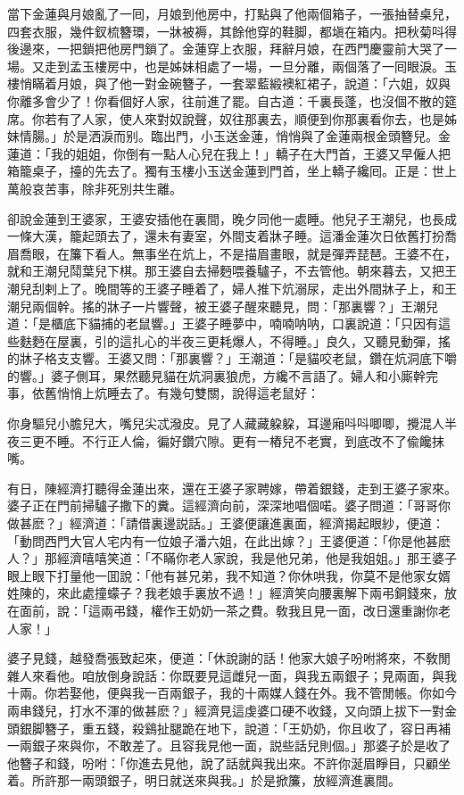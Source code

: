 當下金蓮與月娘亂了一囘，月娘到他房中，打點與了他兩個箱子，一張抽替桌兒，四套衣服，幾件釵梳簪環，一牀被褥，其餘他穿的鞋脚，都塡在箱内。把秋菊呌得後邊來，一把鎖把他房門鎖了。金蓮穿上衣服，拜辭月娘，在西門慶靈前大哭了一場。又走到孟玉樓房中，也是姊妹相處了一場，一旦分離，兩個落了一囘眼淚。玉樓悄瞞着月娘，與了他一對金碗簪子，一套翠藍緞襖紅裙子，說道：「六姐，奴與你離多會少了！你看個好人家，往前進了罷。自古道：千裏長蓬，也沒個不散的筵席。你若有了人家，使人來對奴說聲，奴往那裏去，順便到你那裏看你去，也是姊妹情腸。」於是洒淚而别。臨出門，小玉送金蓮，悄悄與了金蓮兩根金頭簪兒。金蓮道：「我的姐姐，你倒有一點人心兒在我上！」轎子在大門首，王婆又早僱人把箱籠桌子，擡的先去了。獨有玉樓小玉送金蓮到門首，坐上轎子纔囘。正是：世上萬般哀苦事，除非死別共生離。

卻說金蓮到王婆家，王婆安插他在裏間，晚夕同他一處睡。他兒子王潮兒，也長成一條大漢，籠起頭去了，還未有妻室，外間支着牀子睡。這潘金蓮次日依舊打扮喬眉喬眼，在簾下看人。無事坐在炕上，不是描眉畫眼，就是彈弄琵琶。王婆不在，就和王潮兒鬦葉兒下棋。那王婆自去掃麪喂養驢子，不去管他。朝來暮去，又把王潮兒刮剌上了。晚間等的王婆子睡着了，婦人推下炕溺尿，走出外間牀子上，和王潮兒兩個幹。搖的牀子一片響聲，被王婆子醒來聽見，問：「那裏響？」王潮兒道：「是櫃底下貓捕的老鼠響。」王婆子睡夢中，喃喃呐呐，口裏說道：「只因有這些麩麪在屋裏，引的這扎心的半夜三更耗爆人，不得睡。」良久，又聽見動彈，搖的牀子格支支響。王婆又問：「那裏響？」王潮道：「是貓咬老鼠，鑽在炕洞底下嚼的響。」婆子側耳，果然聽見貓在炕洞裏狼虎，方纔不言語了。婦人和小廝幹完事，依舊悄悄上炕睡去了。有幾句雙關，說得這老鼠好：

\begin{myquote}
你身驅兒小膽兒大，嘴兒尖忒潑皮。見了人藏藏躱躱，耳邊廂呌呌唧唧，攪混人半夜三更不睡。不行正人倫，徧好鑽穴隙。更有一樁兒不老實，到底改不了偸饞抹嘴。
\end{myquote}

有日，陳經濟打聽得金蓮出來，還在王婆子家聘嫁，帶着銀錢，走到王婆子家來。婆子正在門前掃驢子撒下的糞。這經濟向前，深深地唱個喏。婆子問道：「哥哥你做甚麽？」經濟道：「請借裏邊説話。」王婆便讓進裏面，經濟揭起眼紗，便道：「動問西門大官人宅内有一位娘子潘六姐，在此出嫁？」王婆便道：「你是他甚麽人？」那經濟嘻嘻笑道：「不瞞你老人家說，我是他兄弟，他是我姐姐。」那王婆子眼上眼下打量他一囬說：「他有甚兄弟，我不知道？你休哄我，你莫不是他家女婿姓陳的，來此處撞蠓子？我老娘手裏放不過！」經濟笑向腰裏解下兩弔銅錢來，放在面前，說：「這兩弔錢，權作王奶奶一茶之費。敎我且見一面，改日還重謝你老人家！」

婆子見錢，越發喬張致起來，便道：「休說謝的話！他家大娘子吩咐將來，不敎閒雜人來看他。咱放倒身說話：你既要見這雌兒一面，與我五兩銀子；見兩面，與我十兩。你若娶他，便與我一百兩銀子，我的十兩媒人錢在外。我不管閒帳。你如今兩串錢兒，打水不渾的做甚麽？」經濟見這虔婆口硬不收錢，又向頭上拔下一對金頭銀脚簪子，重五錢，殺鷄扯腿跪在地下，說道：「王奶奶，你且收了，容日再補一兩銀子來與你，不敢差了。且容我見他一面，説些話兒則個。」那婆子於是收了他簪子和錢，吩咐：「你進去見他，說了話就與我出來。不許你涎眉睜目，只顧坐着。所許那一兩頭銀子，明日就送來與我。」於是掀簾，放經濟進裏間。

